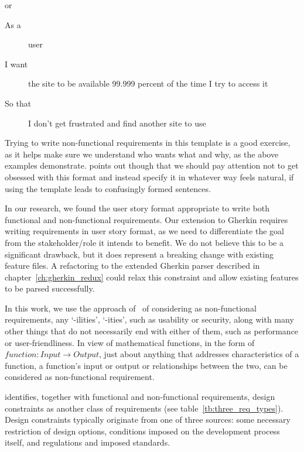 \documentclass[dissertation,final]{softeng}
\newcommand{\nfrs}{non-functional requirements\xspace}
\begin{document}
or

\begin{center}
\begin{description}
\item[As a] user
\item[I want] the site to be available 99.999 percent of the time I try to access it
\item[So that] I don't get frustrated and find another site to use
\end{description}
\end{center}

Trying to write \nfrs in this template is a good exercise, as it helps make sure we understand who wants what and why, as the above examples demonstrate. \citet{CohnNFRS} points out though that we should pay attention not to get obsessed with this format and instead specify it in whatever way feels natural, if using the template leads to confusingly formed sentences.

In our research, we found the user story format appropriate to write both functional and non-functional requirements. Our extension to Gherkin requires writing requirements in user story format, as we need to differentiate the goal from the stakeholder/role it intends to benefit. We do not believe this to be a significant drawback, but it does represent a breaking change with existing feature files. A refactoring to the extended Gherkin parser described in chapter~\ref{ch:gherkin_redux} could relax this constraint and allow existing features to be parsed successfully.

In this work, we use the approach of~\citet{Chung:2009vg} of considering as non-functional requirements, any `-ilities', `-ities', such as usability or security, along with many other things that do not necessarily end with either of them, such as performance or user-friendliness. In view of mathematical functions, in the form of $\mathit{function} : \mathit{Input} \rightarrow \mathit{Output}$, just about anything that addresses characteristics of a function, a function's input or output or relationships between the two, can be considered as non-functional requirement.

\citet{Leffingwell2011} identifies, together with functional and non-functional requirements, design constraints as another class of requirements (see table~\ref{tb:three_req_types}). Design constraints typically originate from one of three sources: some necessary restriction of design options, conditions imposed on the development process itself, and regulations and imposed standards.
\end{document}
